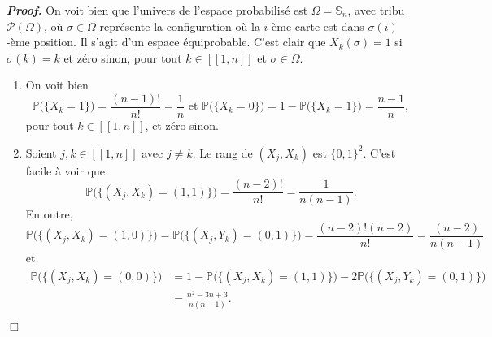 \documentclass[11pt,a4paper]{article}
\newenvironment{preuve}[1][]
{\vskip 2mm  \noindent\emph{\bf Proof#1. }}{$\Box$ \vskip 2mm}
\begin{document}
		\begin{preuve}
			On voit bien que l'univers de l'espace probabilisé est $\Omega = \mathbb{S}_{n}$, avec tribu $\mathscr{P}(\Omega)$, où $\sigma \in \Omega$ représente la configuration où la $i$-ème carte est dans $\sigma(i)$-ème position. 
			Il s'agit d'un espace équiprobable. 
			C'est clair que $X_{k}(\sigma) = 1$ si $\sigma(k)=k$ et zéro sinon, pour tout $k \in [\![ 1 , n ]\!]$ et $\sigma \in \Omega$.
			
			\begin{enumerate}
				\item On voit bien 
				\[     \mathbb{P}\big(\{ X_{k} = 1 \}\big) = \frac{(n-1)!}{n!} = \frac{1}{n} \text{ et } \mathbb{P}\big(\{ X_{k} = 0 \}\big) = 1 - \mathbb{P}\big(\{ X_{k} = 1 \}\big) = \frac{n-1}{n},     \]
				pour tout $k \in [\![ 1 , n ]\!]$, et zéro sinon. 
				
				\item Soient $j, k \in [\![ 1 , n ]\!]$ avec $j \neq k$. 
				Le rang de $(X_{j},X_{k})$ est $\{0,1\}^{2}$. 
				C'est facile à voir que 
				\[     \mathbb{P}\big(\{ (X_{j},X_{k}) = (1,1) \}\big) = \frac{(n-2)!}{n!} = \frac{1}{n(n-1)}.     \]
				En outre, 
				\[     \mathbb{P}\big(\{ (X_{j},X_{k}) = (1,0) \}\big) = \mathbb{P}\big(\{ (X_{j},Y_{k}) = (0,1) \}\big) = \frac{(n-2)! (n-2)}{n!} = \frac{(n-2)}{n(n-1)}     \]
				et 
				\begin{align*}
				\mathbb{P}\big(\{ (X_{j},X_{k}) = (0,0) \}\big) &= 1 - \mathbb{P}\big(\{ (X_{j},X_{k}) = (1,1) \}\big)  - 2 \mathbb{P}\big(\{ (X_{j},Y_{k}) = (0,1) \}\big) 
				\\
				&= \frac{n^{2}- 3 n + 3}{n(n-1)}.
				\end{align*}    
				

\end{enumerate}
\end{preuve}
\end{document}
